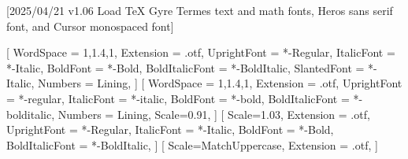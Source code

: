 
[2025/04/21 v1.06 Load TeX Gyre Termes text and math fonts, Heros sans serif font, and Cursor monospaced font]

%
%
\ifpdftex
	\RequirePackage[T1]{fontenc}	
	\RequirePackage{bm}
\else
    \RequirePackage[warnings-off={mathtools-colon,mathtools-overbracket}]{unicode-math}
    \setmainfont{TeXGyreTermesX}[
		WordSpace = {1,1.4,1},
    	Extension = .otf,
    	UprightFont = *-Regular,
    	ItalicFont = *-Italic,
    	BoldFont = *-Bold,
    	BoldItalicFont = *-BoldItalic,
		SlantedFont = *-Italic,
		Numbers = Lining,
	]
    \setsansfont{texgyreheros}[
		WordSpace = {1,1.4,1},
		Extension = .otf,
    	UprightFont = *-regular,
    	ItalicFont = *-italic,
    	BoldFont = *-bold,
    	BoldItalicFont = *-bolditalic,
		Numbers = Lining,
    	Scale=0.91,%
	]        
   \setmonofont{texgyrecursor}[
        Scale=1.03, %
        Extension = .otf,
        UprightFont = *-Regular,
        ItalicFont = *-Italic,
        BoldFont = *-Bold, 
    	BoldItalicFont = *-BoldItalic,
    ]             
    [
    	Scale=MatchUppercase,
    	Extension = .otf,
    ]
    \newcommand*{\FRAC}[1]{{\addfontfeature{Fractions=On}#1}}%
\fi
